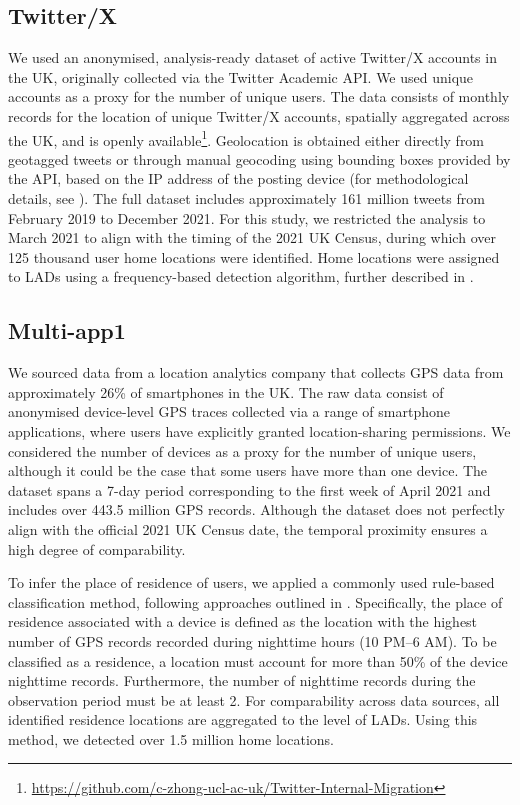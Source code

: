 \documentclass[]{rsos}%
\begin{document}
\subsection{Twitter/X}\label{twitterx}

We used an anonymised, analysis-ready dataset of active Twitter/X
accounts in the UK, originally collected via the Twitter Academic API.
We used unique accounts as a proxy for the number of unique users. The
data consists of monthly records for the location of unique Twitter/X
accounts, spatially aggregated across the UK, and is openly available\footnote{\url{https://github.com/c-zhong-ucl-ac-uk/Twitter-Internal-Migration}}.
Geolocation is obtained either directly from geotagged tweets or through
manual geocoding using bounding boxes provided by the API, based on the
IP address of the posting device (for methodological details, see
\citep{wang2022}). The full dataset includes approximately 161 million tweets
from February 2019 to December 2021. For this study, we restricted the
analysis to March 2021 to align with the timing of the 2021 UK Census,
during which over 125 thousand user home locations were identified. Home locations
were assigned to LADs using a frequency-based detection algorithm,
further described in \citep{wang2022}.

\subsection{Multi-app1}\label{multi-app1}

We sourced data from a location analytics company that collects GPS data
from approximately 26\% of smartphones in the UK. The raw data consist of
anonymised device-level GPS traces collected via a range of smartphone
applications, where users have explicitly granted location-sharing
permissions. We considered the number of devices as a proxy for the
number of unique users, although it could be the case that some users
have more than one device. The dataset spans a 7-day period
corresponding to the first week of April 2021 and includes over 443.5 million
GPS records. Although the dataset does not perfectly align with the
official 2021 UK Census date, the temporal proximity ensures a high
degree of comparability.

To infer the place of residence of users, we applied a commonly used
rule-based classification method, following approaches outlined in
\citep{zhong24working, unstatsMPDMS2025}. Specifically, the place of
residence associated with a device is defined as the location with the
highest number of GPS records recorded during nighttime hours (10 PM--6
AM). To be classified as a residence, a location must account for more
than 50\% of the device nighttime records. Furthermore, the number of
nighttime records during the observation period must be at least 2. For
comparability across data sources, all identified residence locations
are aggregated to the level of LADs. Using this method, we detected over
1.5 million home locations.
\end{document}
